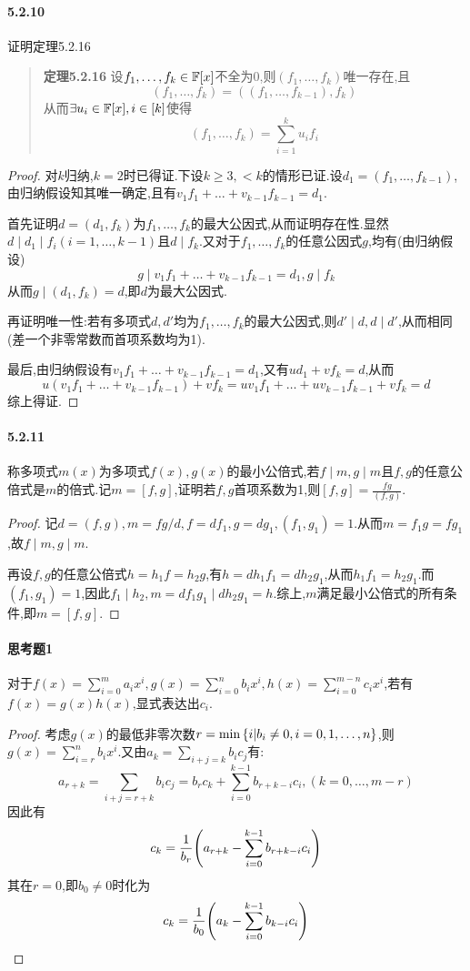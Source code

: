 \documentclass[11pt]{article}
\begin{document}
\paragraph{5.2.10}证明定理5.2.16
\begin{quotation}
    \textbf{定理5.2.16} 设$f_1,\dots,f_k\in \mathbb{F}[x]$不全为0,则$(f_1,\dots,f_k)$唯一存在,且
    $$(f_1,\dots,f_k)=((f_1,\dots,f_{k-1}),f_k)$$
    从而$\exists u_i\in \mathbb{F}[x], i\in [k]$使得
    $$(f_1,\dots,f_k)=\sum_{i=1}^k u_i f_i$$
\end{quotation}
\begin{proof}
    对$k$归纳,$k=2$时已得证.下设$k\geq 3, <k$的情形已证.设$d_1=(f_1,\dots,f_{k-1})$,由归纳假设知其唯一确定,且有$v_1f_1+\dots+v_{k-1}f_{k-1}=d_1$.
    
    首先证明$d=(d_1,f_k)$为$f_1,\dots,f_k$的最大公因式,从而证明存在性.显然$d\mid d_1\mid f_i (i=1,\dots,k-1)$且$d\mid f_k$.又对于$f_1,\dots,f_k$的任意公因式$g$,均有(由归纳假设)
    $$g\mid v_1f_1+\dots+v_{k-1}f_{k-1}=d_1, g\mid f_k$$
    从而$g\mid (d_1,f_k)=d$,即$d$为最大公因式.

    再证明唯一性:若有多项式$d,d'$均为$f_1,\dots,f_k$的最大公因式,则$d'\mid d, d\mid d'$,从而相同(差一个非零常数而首项系数均为1).

    最后,由归纳假设有$v_1f_1+\dots+v_{k-1}f_{k-1}=d_1$,又有$ud_1+vf_k=d$,从而
    $$u(v_1f_1+\dots+v_{k-1}f_{k-1})+vf_k=uv_1f_1+\dots+uv_{k-1}f_{k-1}+vf_k=d$$
    综上得证.
\end{proof}
\paragraph{5.2.11}称多项式$m(x)$为多项式$f(x),g(x)$的最小公倍式,若$f\mid m, g\mid m$且$f,g$的任意公倍式是$m$的倍式.记$m=[f,g]$,证明若$f,g$首项系数为1,则$[f,g]=\frac{fg}{(f,g)}$.
\begin{proof}
    记$d=(f,g), m=fg/d, f=df_1, g=dg_1, (f_1,g_1)=1$.从而$m=f_1g=fg_1$,故$f\mid m, g\mid m$.
    
    再设$f,g$的任意公倍式$h=h_1f=h_2g$,有$h=dh_1f_1=dh_2g_1$,从而$h_1f_1=h_2g_1$.而$(f_1,g_1)=1$,因此$f_1\mid h_2, m=df_1g_1\mid dh_2g_1=h$.综上,$m$满足最小公倍式的所有条件,即$m=[f,g]$.
\end{proof}

\paragraph{思考题1}对于$f(x)=\sum_{i=0}^{m}a_ix^i, g(x)=\sum_{i=0}^{n}b_ix^i, h(x)=\sum_{i=0}^{m-n}c_ix^i$,若有$f(x)=g(x)h(x)$,显式表达出$c_i$.
\begin{proof}
    考虑$g(x)$的最低非零次数$r=\min\left\{i|b_i\neq 0, i=0,1,\dots,n\right\}$,则$g(x)=\sum_{i=r}^{n}b_ix^i$.又由$a_k=\sum_{i+j=k}b_ic_j$有:
    $$a_{r+k}=\sum_{i+j=r+k}b_ic_j=b_rc_k+\sum_{i=0}^{k-1}b_{r+k-i}c_i, (k=0,\dots,m-r)$$
    因此有
    $$c_k=\frac{1}{b_r}\!\left(a_{r+k}-\sum_{i=0}^{k-1}b_{r+k-i}c_i\right)$$
    其在$r=0$,即$b_0\neq 0$时化为
    $$c_k=\frac{1}{b_0}\!\left(a_{k}-\sum_{i=0}^{k-1}b_{k-i}c_i\right)$$
\end{proof}
\end{document}

